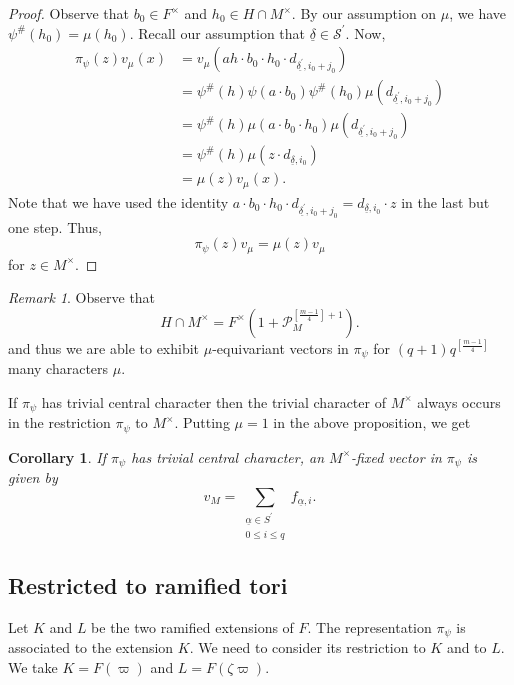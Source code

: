 \documentclass[12pt]{amsart}
\newtheorem{corollary}[theorem]{Corollary}%
\theoremstyle{definition}
\theoremstyle{remark}
\newtheorem{remark}{Remark}
\begin{document}
\begin{proof}
Observe that $b_0 \in F^\times$ and $h_0 \in H \cap M^\times$. By our assumption on $\mu$, we have $\psi^\#(h_0) = \mu(h_0)$. Recall our assumption that $\underline{\delta} \in \mathcal S^\prime$. Now, 
\begin{align*}
 \pi_\psi(z) v_{\mu}(x) &= v_\mu \left(ah \cdot b_0 \cdot h_0 \cdot d_{\underline{\delta^\prime}, i_0 + j_0} \right) \\
&= \psi^\#(h) \psi (a \cdot b_0) \psi^\#(h_0) \mu(d_{\underline{\delta^\prime}, i_0 + j_0})  \\
&= \psi^\#(h) \mu(a \cdot b_0 \cdot h_0) \mu(d_{\underline{\delta^\prime}, i_0 + j_0})  \\
&= \psi^\#(h) \mu(z \cdot d_{\underline{\delta}, i_0}) \\
&= \mu(z) v_{\mu}(x).
\end{align*}
Note that we have used the identity $a \cdot b_0 \cdot h_0 \cdot d_{\underline{\delta^\prime}, i_0 + j_0} =  d_{\underline{\delta}, i_0} \cdot z$ in the last but one step. Thus,
\[\pi_\psi(z) v_{\mu}= \mu(z) v_{\mu}\]
for $z \in M^\times$.
\end{proof}

\begin{remark}\label{rmk1}
Observe that \[H \cap M^\times = F^\times (1 + \mathcal P_M^{[\frac{m-1}{4}]+1}).\] 
and thus we are able to exhibit $\mu$-equivariant vectors in $\pi_\psi$ for $(q+1)q^{[\frac{m-1}{4}]}$ many characters $\mu$.
\end{remark}

If $\pi_\psi$ has trivial central character then the trivial character of $M^\times$ always occurs in the restriction $\pi_\psi$ to $M^\times$. Putting $\mu=1$ in the above proposition, we get 

\begin{corollary}\label{cor1}
If $\pi_\psi$ has trivial central character, an $M^\times$-fixed vector in $\pi_\psi$ is given by
\[v_M = \sum\limits_{\substack{\underline{\alpha} \in S^\prime  \\    0 \leq i \leq q }} f_{\underline{\alpha}, i}. \]
\end{corollary}

\subsection{Restricted to ramified tori}

Let $K$ and $L$ be the two ramified extensions of $F$. The representation $\pi_\psi$ is associated to the extension $K$. We need to consider its restriction to $K$ and to $L$. We take $K = F(\varpi)$ and $L=F(\zeta\varpi)$.
\end{document}
